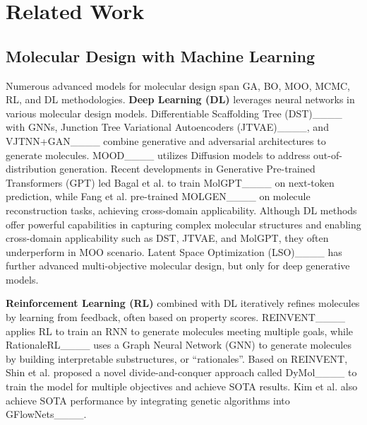 \section{Related Work}
\subsection{Molecular Design with Machine Learning}
Numerous advanced models for molecular design span GA, BO, MOO, MCMC, RL, and DL methodologies. \textbf{Deep Learning (DL)} leverages neural networks in various molecular design models. Differentiable Scaffolding Tree (DST)____ with GNNs, Junction Tree Variational Autoencoders (JTVAE)____, and VJTNN+GAN____ combine generative and adversarial architectures to generate molecules. MOOD____ utilizes Diffusion models to address out-of-distribution generation. Recent developments in Generative Pre-trained Transformers (GPT) led Bagal et al. to train MolGPT____ on next-token prediction, while Fang et al. pre-trained MOLGEN____ on molecule reconstruction tasks, achieving cross-domain applicability. Although DL methods offer powerful capabilities in capturing complex molecular structures and enabling cross-domain applicability such as DST, JTVAE, and MolGPT, they often underperform in MOO scenario. Latent Space Optimization (LSO)____ has further advanced multi-objective molecular design, but only for deep generative models. 

\textbf{Reinforcement Learning (RL)} combined with DL iteratively refines molecules by learning from feedback, often based on property scores. REINVENT____ applies RL to train an RNN to generate molecules meeting multiple goals, while RationaleRL____ uses a Graph Neural Network (GNN) to generate molecules by building interpretable substructures, or ``rationales''. Based on REINVENT, Shin et al. proposed a novel divide-and-conquer approach called DyMol____ to train the model for multiple objectives and achieve SOTA results. Kim et al. also achieve SOTA performance by integrating genetic algorithms into GFlowNets____.


